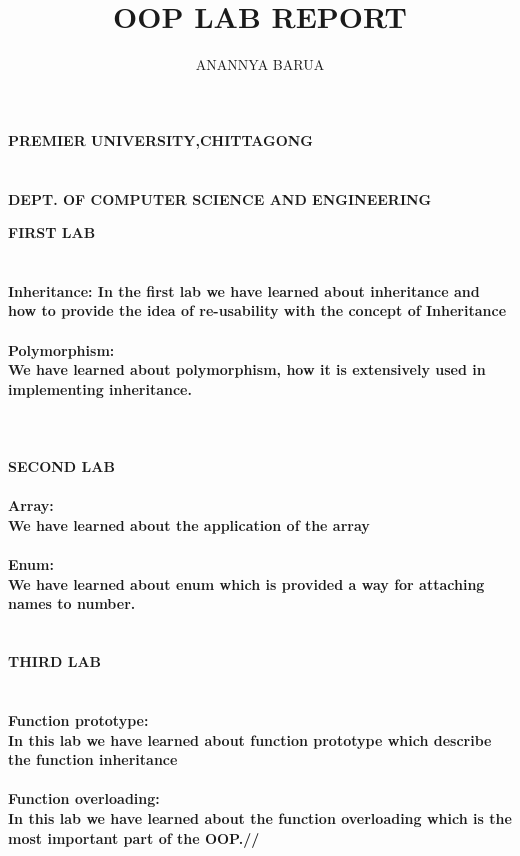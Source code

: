 \documentclass[12pt]{article}
\title{OOP LAB REPORT}
\author{ANANNYA BARUA}
\begin{document}
\textbf{\bigskip \bigskip \bigskip \bigskip \bigskip  \center PREMIER UNIVERSITY,CHITTAGONG \\}
 \textbf{\\ \\DEPT. OF COMPUTER SCIENCE AND ENGINEERING}
\maketitle
\newpage
\textbf{\center FIRST LAB \\}
\paragraph{\\Inheritance:
In the first lab we have learned about inheritance and how to provide the idea of re-usability with the concept of Inheritance }
\paragraph{Polymorphism: \\
We have learned about polymorphism, how it is extensively used in implementing inheritance. \\ \\}
\textbf{\\ \center SECOND LAB \\}
\paragraph{Array: \\
We have learned about the application of the array}
\paragraph{Enum: \\
We have learned about enum which is provided a way for attaching names to number.\\ \\}
\textbf{\center THIRD LAB \\}
\paragraph{\\ Function prototype:\\ 
In this lab we have learned about function prototype which describe the function inheritance \\}
\paragraph{Function overloading:\\
In this lab we have learned about the function overloading which is the most important part of the OOP.//}
\end{document}
